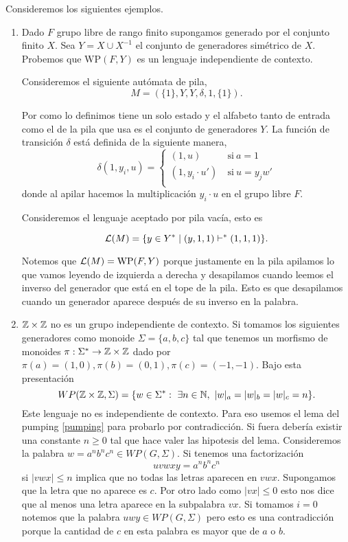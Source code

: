 \documentclass[tesis.tex]{subfiles}
\begin{document}
\begin{ej} Consideremos los siguientes ejemplos.	
	\begin{enumerate}[E1.]
		\item {}
		Dado $F$ grupo libre de rango finito supongamos generado por el conjunto finito $X$. 
		Sea  $Y = X \cup X^{-1}$ el conjunto de generadores simétrico de $X$. 
		Probemos que $\text{WP}(F,Y)$ es un lenguaje independiente de contexto.
		
		Consideremos el siguiente autómata de pila,
		\[
		M = (\{ 1 \}, Y, Y, \delta, 1, \{1\}).
		\]
		
		Por como lo definimos tiene un solo estado y el alfabeto tanto de entrada como el de la pila que usa es el conjunto de generadores $Y$.
		La función de transición $\delta$ está definida de la siguiente manera,
		\[
		\delta(1, y_i, u)=\left\{
		\begin{array}{ll}
		(1 , u )  &\ \text{si} \ a = 1  \\
		(1, y_i \cdot u') &\ \text{si} \  u = y_jw'  \\
		\end{array}
		\right.
		\]
		donde al apilar hacemos la multiplicación $y_i \cdot u$ en el grupo libre $F$.
		
		Consideremos el lenguaje aceptado por pila vacía, esto es
		
		\[
		{\cal L }(M) = \{  y \in Y^* \mid (y,1,1)   \vdash^*  (1, 1, 1)  \}.
		\]
		
		Notemos que ${\cal L }(M) = \text{WP}(F,Y)$ porque justamente en la pila apilamos lo que vamos leyendo de izquierda a derecha y desapilamos cuando leemos el inverso del generador que está en el tope de la pila.
		Esto es que desapilamos cuando un generador aparece después de su inverso en la palabra.

		
		\item 	$\mathbb{Z} \times \mathbb{Z}$ no es un grupo independiente de contexto.
		Si tomamos los siguientes generadores como monoide $\Sigma = \{ a,b,c \}$ tal que tenemos un morfismo de monoides $\pi: \Sigma^* \to \mathbb{Z} \times \mathbb{Z}$ dado por $\pi(a)=(1,0), \pi(b)=(0,1), \pi(c)=(-1,-1)$.
		Bajo esta presentación 
		\[
		WP(\mathbb{Z} \times \mathbb{Z}, \Sigma) = \{ w \in \Sigma^*  : \ \exists n \in \mathbb{N}, \ |w|_a = |w|_b = |w|_c = n \}.
		\]
		Este lenguaje no es independiente de contexto.
		Para eso usemos el lema del pumping \ref{pumping} para probarlo por contradicción.
		Si fuera \ic debería existir una constante $n \ge 0$ tal que hace valer las hipotesis del lema.
		Consideremos la palabra $w = a^n b^n c^n \in WP(G, \Sigma)$.
		Si tenemos una factorización 
		\[
		uvwxy = a^nb^nc^n
		\]
		si $|vwx| \le n$ implica que no todas las letras aparecen en $vwx$.
		Supongamos que la letra que no aparece es $c$.
		Por otro lado como $|vx| \le 0$ esto nos dice que al menos una letra aparece en la subpalabra $vx$.
		Si tomamos $i=0$ notemos que la palabra $uwy \in WP(G,\Sigma)$ pero esto es una contradicción porque la cantidad de $c$ en esta palabra es mayor que de $a$ o $b$.
	\end{enumerate}
\end{ej}
\end{document}
